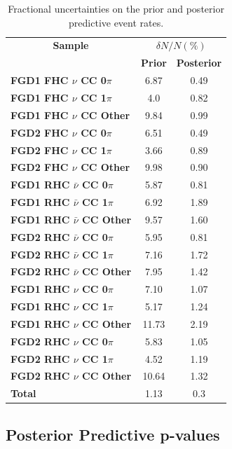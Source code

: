 \begin{center}
\begin{table}
\center
\begin{tabular}{l||c c}
\hline \hline
\multicolumn{1}{c||}{\textbf{Sample}} & \multicolumn{2}{c}{$\delta N/N(\%)$}\\
& \multicolumn{1}{c}{\textbf{Prior}} & \multicolumn{1}{c}{\textbf{Posterior}} \\
\hline\hline
\textbf{FGD1 FHC $\nu$ CC 0$\pi$} & 6.87 & 0.49\\
\textbf{FGD1 FHC $\nu$ CC 1$\pi$} & 4.0 & 0.82\\ 
\textbf{FGD1 FHC $\nu$ CC Other} & 9.84 & 0.99\\ \hline
\textbf{FGD2 FHC $\nu$ CC 0$\pi$} & 6.51 & 0.49\\
\textbf{FGD2 FHC $\nu$ CC 1$\pi$} & 3.66 & 0.89\\
\textbf{FGD2 FHC $\nu$ CC Other} & 9.98 & 0.90\\ \hline
\textbf{FGD1 RHC $\bar{\nu}$ CC 0$\pi$} & 5.87 & 0.81\\
\textbf{FGD1 RHC $\bar{\nu}$ CC 1$\pi$} & 6.92 & 1.89\\
\textbf{FGD1 RHC $\bar{\nu}$ CC Other} & 9.57 & 1.60\\ \hline
\textbf{FGD2 RHC $\bar{\nu}$ CC 0$\pi$} & 5.95 & 0.81\\
\textbf{FGD2 RHC $\bar{\nu}$ CC 1$\pi$} & 7.16 & 1.72\\
\textbf{FGD2 RHC $\bar{\nu}$ CC Other} & 7.95 & 1.42\\ \hline
\textbf{FGD1 RHC $\nu$ CC 0$\pi$} & 7.10 & 1.07\\
\textbf{FGD1 RHC $\nu$ CC 1$\pi$} & 5.17 & 1.24\\
\textbf{FGD1 RHC $\nu$ CC Other} & 11.73 & 2.19\\ \hline
\textbf{FGD2 RHC $\nu$ CC 0$\pi$} & 5.83 & 1.05\\
\textbf{FGD2 RHC $\nu$ CC 1$\pi$} & 4.52 & 1.19\\ 
\textbf{FGD2 RHC $\nu$ CC Other} & 10.64 & 1.32\\ \hline
\textbf{Total} & 1.13 & 0.3\\ \hline\hline
\end{tabular}
\caption{Fractional uncertainties on the prior and posterior predictive event rates.}
\label{tab:prederr}
\end{table}
\end{center}

\subsection{Posterior Predictive p-values}

